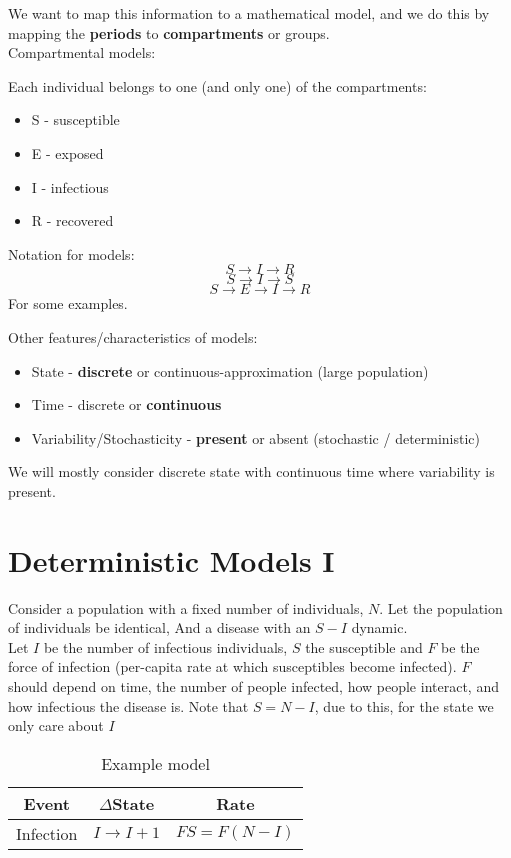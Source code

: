 \documentclass{X:/Documents/Coding/Latex/myassignment}
\begin{document}
We want to map this information to a mathematical model, and we do this by mapping the \textbf{periods} to \textbf{compartments} or groups.\\


Compartmental models:


Each individual belongs to one (and only one) of the compartments:
\begin{itemize}
    \item S - susceptible
    \item E - exposed
    \item I - infectious
    \item R - recovered
\end{itemize}
Notation for models:
\[S\to I \to R\]
\[S\to I\to S\]
\[S\to E\to I\to R\]
For some examples.


Other features/characteristics of models:
\begin{itemize}
    \item State - \textbf{discrete} or continuous-approximation (large population)
    \item Time  - discrete or \textbf{continuous}
    \item Variability/Stochasticity - \textbf{present} or absent (stochastic / deterministic)
\end{itemize}

We will mostly consider discrete state with continuous time where variability is present.


\section{Deterministic Models I}
Consider a population with a fixed number of individuals, $N$. Let the population of individuals be identical, And a disease with an $S-I$ dynamic.\\
Let $I$ be the number of infectious individuals, $S$ the susceptible and $F$ be the force of infection (per-capita rate at which susceptibles become infected).
$F$ should depend on time, the number of people infected, how people interact, and how infectious the disease is. Note that $S = N-I$, due to this, for the state we only care about $I$
\begin{table}[h]
    \centering
    \begin{tabular}{c|c|c}
         Event&$\Delta$State&Rate  \\
         \hline
         Infection&$I\to I+1$&$FS= F(N-I)$
    \end{tabular}
    \caption{Example model}
\end{table}
\end{document}
